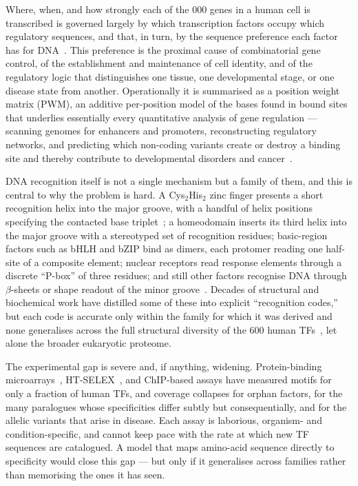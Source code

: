 \documentclass[11pt,letterpaper]{article}
\begin{document}
Where, when, and how strongly each of the 000 genes in a human cell is transcribed is
governed largely by which transcription factors occupy which regulatory sequences, and that, in
turn, by the sequence preference each factor has for DNA~\cite{Stormo2000,Deplancke2016}. This
preference is the proximal cause of combinatorial gene control, of the establishment and
maintenance of cell identity, and of the regulatory logic that distinguishes one tissue, one
developmental stage, or one disease state from another. Operationally it is summarised as a
position weight matrix (PWM), an additive per-position model of the bases found in bound sites
that underlies essentially every quantitative analysis of gene regulation --- scanning genomes
for enhancers and promoters, reconstructing regulatory networks, and predicting which non-coding
variants create or destroy a binding site and thereby contribute to developmental disorders and
cancer~\cite{Zhou2017,Deplancke2016}.

DNA recognition itself is not a single mechanism but a family of them, and this is central to why
the problem is hard. A Cys$_2$His$_2$ zinc finger presents a short recognition helix into the
major groove, with a handful of helix positions specifying the contacted base
triplet~\cite{Pavletich1991,Wolfe2000}; a homeodomain inserts its third helix into the major
groove with a stereotyped set of recognition residues; basic-region factors such as bHLH and
bZIP bind as dimers, each protomer reading one half-site of a composite element; nuclear
receptors read response elements through a discrete ``P-box'' of three residues; and still other
factors recognise DNA through $\beta$-sheets or shape readout of the minor
groove~\cite{Luscombe2001}. Decades of structural and biochemical work have distilled some of
these into explicit ``recognition codes,'' but each code is accurate only within the family for
which it was derived and none generalises across the full structural diversity of the
600 human TFs~\cite{Lambert2018,Vaquerizas2009}, let alone the broader eukaryotic
proteome.

The experimental gap is severe and, if anything, widening. Protein-binding
microarrays~\cite{Berger2006}, HT-SELEX~\cite{Jolma2013}, and ChIP-based assays have measured
motifs for only a fraction of human TFs, and coverage collapses for orphan factors, for the
many paralogues whose specificities differ subtly but consequentially, and for the allelic
variants that arise in disease. Each assay is laborious, organism- and condition-specific, and
cannot keep pace with the rate at which new TF sequences are catalogued. A model that maps
amino-acid sequence directly to specificity would close this gap --- but only if it generalises
across families rather than memorising the ones it has seen.
\end{document}
